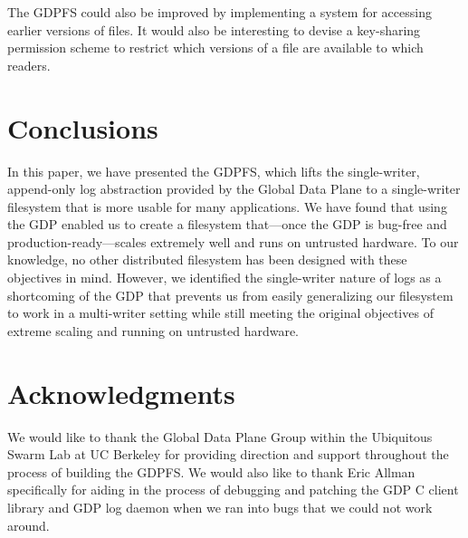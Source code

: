 \documentclass{acm_proc_article-sp}
\begin{document}
The GDPFS could also be improved by implementing a system for accessing earlier versions of files. It would also be interesting to devise a key-sharing permission scheme to restrict which versions of a file are available to which readers.

\section{Conclusions}
In this paper, we have presented the GDPFS, which lifts the single-writer, append-only log abstraction provided by the Global Data Plane to a single-writer filesystem that is more usable for many applications. We have found that using the GDP enabled us to create a filesystem that---once the GDP is bug-free and production-ready---scales extremely well and runs on untrusted hardware. To our knowledge, no other distributed filesystem has been designed with these objectives in mind. However, we identified the single-writer nature of logs as a shortcoming of the GDP that prevents us from easily generalizing our filesystem to work in a multi-writer setting while still meeting the original objectives of extreme scaling and running on untrusted hardware.

\section{Acknowledgments}
We would like to thank the Global Data Plane Group within the Ubiquitous Swarm Lab at UC Berkeley for providing direction and support throughout the process of building the GDPFS. We would also like to thank Eric Allman specifically for aiding in the process of debugging and patching the GDP C client library and GDP log daemon when we ran into bugs that we could not work around.

%

%
%
\balancecolumns
\end{document}
